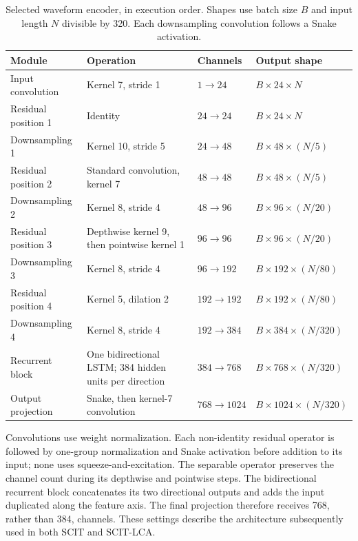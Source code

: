 \begin{table}[t]
\centering
\caption{Selected waveform encoder, in execution order. Shapes use batch size $B$ and input length $N$ divisible by 320. Each downsampling convolution follows a Snake activation.}
\label{tab:sv3-encoder}
\small
\begin{tabularx}{\textwidth}{@{}p{}Yp{0.18\textwidth}p{0.19\textwidth}@{}}
\toprule
Module & Operation & Channels & Output shape\\
\midrule
Input convolution & Kernel 7, stride 1 & $1\rightarrow24$ & $B\times24\times N$\\
Residual position 1 & Identity & $24\rightarrow24$ & $B\times24\times N$\\
Downsampling 1 & Kernel 10, stride 5 & $24\rightarrow48$ & $B\times48\times(N/5)$\\
Residual position 2 & Standard convolution, kernel 7 & $48\rightarrow48$ & $B\times48\times(N/5)$\\
Downsampling 2 & Kernel 8, stride 4 & $48\rightarrow96$ & $B\times96\times(N/20)$\\
Residual position 3 & Depthwise kernel 9, then pointwise kernel 1 & $96\rightarrow96$ & $B\times96\times(N/20)$\\
Downsampling 3 & Kernel 8, stride 4 & $96\rightarrow192$ & $B\times192\times(N/80)$\\
Residual position 4 & Kernel 5, dilation 2 & $192\rightarrow192$ & $B\times192\times(N/80)$\\
Downsampling 4 & Kernel 8, stride 4 & $192\rightarrow384$ & $B\times384\times(N/320)$\\
Recurrent block & One bidirectional LSTM; 384 hidden units per direction & $384\rightarrow768$ & $B\times768\times(N/320)$\\
Output projection & Snake, then kernel-7 convolution & $768\rightarrow1024$ & $B\times1024\times(N/320)$\\
\bottomrule
\end{tabularx}
\end{table}

Convolutions use weight normalization. Each non-identity residual operator is followed by one-group normalization and Snake activation before addition to its input; none uses squeeze-and-excitation. The separable operator preserves the channel count during its depthwise and pointwise steps. The bidirectional recurrent block concatenates its two directional outputs and adds the input duplicated along the feature axis. The final projection therefore receives 768, rather than 384, channels. These settings describe the architecture subsequently used in both SCIT and SCIT-LCA.

